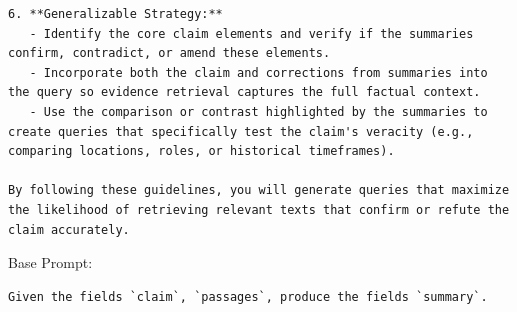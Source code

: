 \begin{instructbox}
\begin{lstlisting}[breakindent=0pt, breaklines=true, breakatwhitespace=true, frame=single, backgroundcolor=\color{blue!10}]
6. **Generalizable Strategy:**
   - Identify the core claim elements and verify if the summaries confirm, contradict, or amend these elements.
   - Incorporate both the claim and corrections from summaries into the query so evidence retrieval captures the full factual context.
   - Use the comparison or contrast highlighted by the summaries to create queries that specifically test the claim's veracity (e.g., comparing locations, roles, or historical timeframes).

By following these guidelines, you will generate queries that maximize the likelihood of retrieving relevant texts that confirm or refute the claim accurately.
\end{lstlisting}
\end{instructbox}\begin{instructbox}
Base Prompt:
\begin{lstlisting}[breakindent=0pt, breaklines=true, breakatwhitespace=true, frame=single, backgroundcolor=\color{gray!10}]
Given the fields `claim`, `passages`, produce the fields `summary`.
\end{lstlisting}


\end{instructbox}
